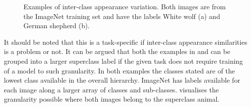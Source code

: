 \begin{figure}[H]
\begin{subfigure}[b]{0.45\textwidth}
        \caption{}\label{fig:inter2b}
    \end{subfigure}
    \caption{Examples of inter-class appearance variation. Both images are from the ImageNet training set \cite{imagenet} and have the labels White wolf (a) and German shepherd (b).}
    \label{fig:inter2}
\end{figure} 

It should be noted that this is a task-specific if inter-class appearance similarities is a problem or not. It can be argued that both the examples in  and  can be grouped into a larger superclass label if the given task does not require training of a model to such granularity. In both examples the classes stated are of the lowest class available in the overall hierarchy. ImageNet has labels available for each image along a larger array of classes and sub-classes.  visualises the granularity possible where both images belong to the superclass animal.

